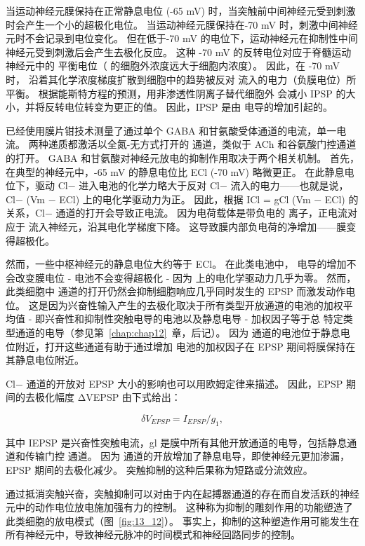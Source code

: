 当运动神经元膜保持在正常静息电位 (-65 mV) 时，当突触前中间神经元受到刺激时会产生一个小的超极化电位。
当运动神经元膜保持在-70 mV 时，刺激中间神经元时不会记录到电位变化。
但在低于-70 mV 的电位下，运动神经元在抑制性中间神经元受到刺激后会产生去极化反应。
这种 -70 mV 的反转电位对应于脊髓运动神经元中的  平衡电位（ 的细胞外浓度远大于细胞内浓度）。
因此，在 -70 mV 时， 沿着其化学浓度梯度扩散到细胞中的趋势被反对  流入的电力（负膜电位）所平衡。
根据能斯特方程的预测，用非渗透性阴离子替代细胞外  会减小 IPSP 的大小，并将反转电位转变为更正的值。
因此，IPSP 是由  电导的增加引起的。


已经使用膜片钳技术测量了通过单个 GABA 和甘氨酸受体通道的电流，单一电流。
两种递质都激活以全氮-无方式打开的  通道，类似于 ACh 和谷氨酸门控通道的打开。
GABA 和甘氨酸对神经元放电的抑制作用取决于两个相关机制。
首先，在典型的神经元中，-65 mV 的静息电位比 ECl (-70 mV) 略微更正。
在此静息电位下，驱动 Cl− 进入电池的化学力略大于反对 Cl− 流入的电力——也就是说，Cl− (Vm − ECl) 上的电化学驱动力为正。
因此，根据 ICl = gCl (Vm − ECl) 的关系，Cl− 通道的打开会导致正电流。 因为电荷载体是带负电的  离子，正电流对应于  流入神经元，沿其电化学梯度下降。
这导致膜内部负电荷的净增加——膜变得超极化。


然而，一些中枢神经元的静息电位大约等于 ECl。 在此类电池中， 电导的增加不会改变膜电位 - 电池不会变得超极化 - 因为  上的电化学驱动力几乎为零。
然而，此类细胞中  通道的打开仍然会抑制细胞响应几乎同时发生的 EPSP 而激发动作电位。
这是因为兴奋性输入产生的去极化取决于所有类型开放通道的电池的加权平均值 - 即兴奋性和抑制性突触电导的电池以及静息电导 - 加权因子等于总 特定类型通道的电导（参见第~\ref{chap:chap12}~章，后记）。
因为  通道的电池位于静息电位附近，打开这些通道有助于通过增加  电池的加权因子在 EPSP 期间将膜保持在其静息电位附近。


Cl− 通道的开放对 EPSP 大小的影响也可以用欧姆定律来描述。
因此，EPSP 期间的去极化幅度 ΔVEPSP 由下式给出：


\begin{equation}\label{depolarization_amplitude}
	\delta V_{EPSP} = I_{EPSP} / g_1,
\end{equation}


其中 IEPSP 是兴奋性突触电流，gl 是膜中所有其他开放通道的电导，包括静息通道和传输门控  通道。 因为  通道的开放增加了静息电导，即使神经元更加渗漏，EPSP 期间的去极化减少。
突触抑制的这种后果称为短路或分流效应。


通过抵消突触兴奋，突触抑制可以对由于内在起搏器通道的存在而自发活跃的神经元中的动作电位放电施加强有力的控制。
这种称为抑制的雕刻作用的功能塑造了此类细胞的放电模式（图~\ref{fig:13_12}）。 
事实上，抑制的这种塑造作用可能发生在所有神经元中，导致神经元脉冲的时间模式和神经回路同步的控制。


